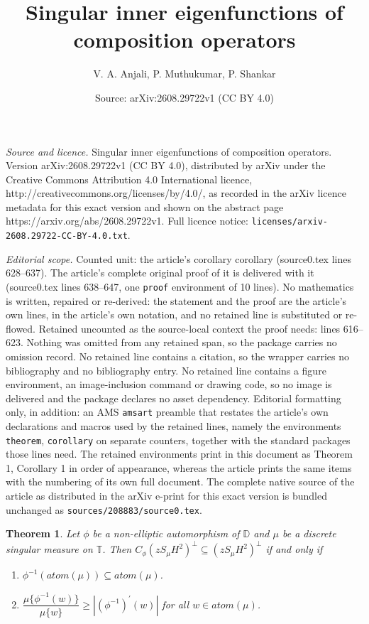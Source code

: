 \documentclass[10pt,a4paper]{amsart}
\title{Singular inner eigenfunctions of composition operators}
\author{V. A. Anjali, P. Muthukumar, P. Shankar}
\date{Source: arXiv:2608.29722v1 (CC BY 4.0)}
\newtheorem{theorem}{Theorem}
\begin{document}
\maketitle

\noindent\emph{Source and licence.} Singular inner eigenfunctions of composition operators. Version arXiv:2608.29722v1 (CC BY 4.0), distributed by arXiv under the Creative Commons Attribution 4.0 International licence, http://creativecommons.org/licenses/by/4.0/, as recorded in the arXiv licence metadata for this exact version and shown on the abstract page https://arxiv.org/abs/2608.29722v1. Full licence notice: \texttt{licenses/arxiv-2608.29722-CC-BY-4.0.txt}.\par\smallskip

\noindent\textit{Editorial scope.} Counted unit: the article's corollary corollary (source0.tex lines 628--637). The article's complete original proof of it is delivered with it (source0.tex lines 638--647, one \texttt{proof} environment of 10 lines). No mathematics is written, repaired or re-derived: the statement and the proof are the article's own lines, in the article's own notation, and no retained line is substituted or re-flowed.  Retained uncounted as the source-local context the proof needs: lines 616--623.  Nothing was omitted from any retained span, so the package carries no omission record.  No retained line contains a citation, so the wrapper carries no bibliography and no bibliography entry.  No retained line contains a figure environment, an image-inclusion command or drawing code, so no image is delivered and the package declares no asset dependency.  Editorial formatting only, in addition: an AMS \texttt{amsart} preamble that restates the article's own declarations and macros used by the retained lines, namely the environments \texttt{theorem}, \texttt{corollary} on separate counters, together with the standard packages those lines need.  The retained environments print in this document as Theorem 1, Corollary 1 in order of appearance, whereas the article prints the same items with the numbering of its own full document.  The complete native source of the article as distributed in the arXiv e-print for this exact version is bundled unchanged as \texttt{sources/208883/source0.tex}.
\begin{theorem}\label{pure}
	Let $\phi$ be a non-elliptic automorphism of $\mathbb{D}$ and $\mu$ be a discrete singular measure on $\mathbb{T}$. Then $C_{\phi}(zS_{\mu}H^2)^{\perp}\subseteq(zS_{\mu}H^2)^{\perp}$
	if and only if 
	\begin{enumerate}
		\item $\phi^{-1}(atom(\mu))\subseteq{atom(\mu)}$.
		\item $\dfrac{\mu\{\phi^{-1}(w)\}}{\mu\{w\}}\geq |({\phi^{-1}})^{'}(w)|$ for all $w \in atom{(\mu)}$.
	\end{enumerate}
\end{theorem}
\end{document}

